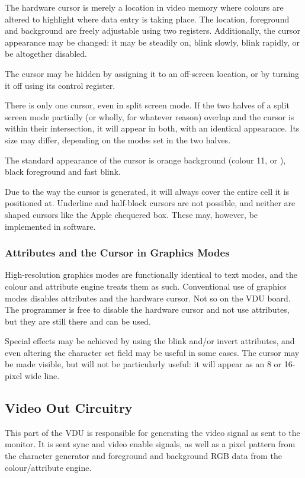 The hardware cursor is merely a location in video memory where colours are
altered to highlight where data entry is taking place. The location, foreground
and background are freely adjustable using two registers. Additionally, the
cursor appearance may be changed: it may be steadily on, blink slowly, blink
rapidly, or be altogether disabled.

The cursor may be hidden by assigning it to an off-screen location, or by
turning it off using its control register.

There is only one cursor, even in split screen mode. If the two halves of a
split screen mode partially (or wholly, for whatever reason) overlap and the
cursor is within their intersection, it will appear in both, with an identical
appearance. Its size may differ, depending on the modes set in the two halves.

The standard appearance of the cursor is orange background (colour 11, or
), black foreground and fast blink.

Due to the way the cursor is generated, it will always cover the entire cell it
is positioned at. Underline and half-block cursors are not possible, and
neither are shaped cursors like the Apple chequered box. These may, however, be
implemented in software.

\subsubsection{Attributes and the Cursor in Graphics Modes}

High-resolution graphics modes are functionally identical to text modes, and
the colour and attribute engine treats them as such. Conventional use of
graphics modes disables attributes and the hardware cursor. Not so on the VDU
board. The programmer is free to disable the hardware cursor and not use
attributes, but they are still there and can be used.

Special effects may be achieved by using the blink and/or invert attributes,
and even altering the character set field may be useful in some cases. The
cursor may be made visible, but will not be particularly useful: it will appear
as an 8 or 16-pixel wide line.

\subsection{Video Out Circuitry}
\label{sec:vdu:video-out}

This part of the VDU is responsible for generating the video signal as sent to
the monitor. It is sent sync and video enable signals, as well as a pixel
pattern from the character generator and foreground and background RGB data
from the colour/attribute engine.

